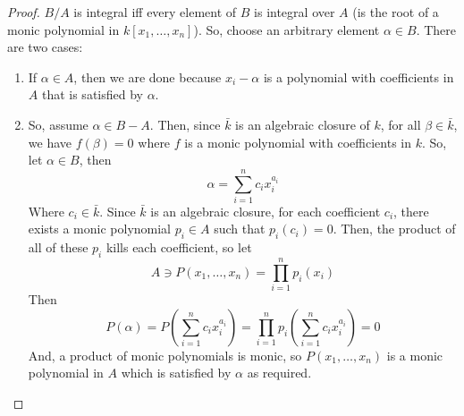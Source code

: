 \documentclass[hidelinks,12pt]{article}
\begin{document}
\begin{enumerate}
    \begin{proof}
        \(B/A\) is integral iff every element of \(B\) is integral over \(A\) (is the root of a monic polynomial in \(k[x_{1},\dots,x_{n}]\)). So, choose an arbitrary element \(\alpha\in B\). There are two cases:
        \begin{enumerate}
            \item If \(\alpha\in A\), then we are done because \(x_{i}-\alpha\) is a polynomial with coefficients in \(A\) that is satisfied by \(\alpha\).
            \item So, assume \(\alpha\in B-A\). Then, since \(\bar{k}\) is an algebraic closure of \(k\), for all \(\beta\in\bar{k}\), we have \(f(\beta)=0\) where \(f\) is a monic polynomial with coefficients in \(k\). So, let \(\alpha\in B\), then \[
                    \alpha=\sum_{i=1}^{n} c_{i}x_{i}^{a_{i}}
            \]
            Where \(c_{i}\in\bar{k}\). Since \(\bar{k}\) is an algebraic closure, for each coefficient \(c_{i}\), there exists a monic polynomial \(p_{i}\in A\) such that \(p_{i}(c_{i})=0\). Then, the product of all of these \(p_{i}\) kills each coefficient, so let \[
            A\ni P(x_{1},\dots,x_{n})=\prod_{i=1}^{n}p_{i}(x_{i})
            \]
            Then
             \[
                 P\left(\alpha\right)=P\left(\sum_{i=1}^{n}c_{i}x_{i}^{a_{i}}\right)=\prod_{i=1}^{n}p_{i}\left(\sum_{i=1}^{n}c_{i}x_{i}^{a_{i}}\right)=0
            \]
           And, a product of monic polynomials is monic, so \(P(x_{1},\dots,x_{n})\) is a monic polynomial in \(A\) which is satisfied by \(\alpha\) as required.
        \end{enumerate}
    \end{proof}
\end{enumerate}
\end{document}
